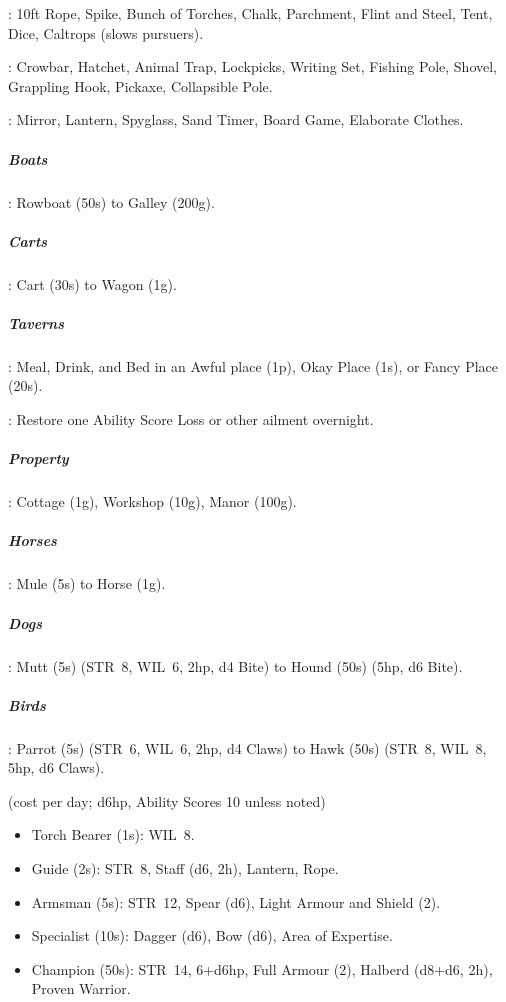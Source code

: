 \documentclass[itdr]{subfiles}
\begin{document}
: 10ft Rope, Spike, Bunch of Torches, Chalk, Parchment, Flint and Steel, Tent, Dice, Caltrops (slows pursuers).

: Crowbar, Hatchet, Animal Trap, Lockpicks, Writing Set, Fishing Pole, Shovel, Grappling Hook, Pickaxe, Collapsible Pole.

: Mirror, Lantern, Spyglass, Sand Timer, Board Game, Elaborate Clothes.


\subparagraph{Boats}: Rowboat (50s) to Galley (200g).
	
\subparagraph{Carts}: Cart (30s) to Wagon (1g).

\subparagraph{Taverns}: Meal, Drink, and Bed in an Awful place (1p), Okay Place (1s), or Fancy Place (20s).

: Restore one Ability Score Loss or other ailment overnight.

\subparagraph{Property}: Cottage (1g), Workshop (10g), Manor (100g).

\subparagraph{Horses}: Mule (5s) to Horse (1g).

\subparagraph{Dogs}: Mutt (5s) (STR~8, WIL~6, 2hp, d4 Bite) to Hound (50s) (5hp, d6 Bite).

\subparagraph{Birds}: Parrot (5s) (STR~6, WIL~6, 2hp, d4 Claws) to Hawk (50s) (STR~8, WIL~8, 5hp, d6 Claws).

 (cost per day; d6hp, Ability Scores 10
unless noted)
\begin{itemize}
	\item Torch Bearer (1s): WIL~8.
	\item Guide (2s): STR~8, Staff (d6, 2h), Lantern, Rope.
	\item Armsman (5s): STR~12, Spear (d6), Light Armour and Shield (2).
	\item Specialist (10s): Dagger (d6), Bow (d6), Area of Expertise.
	\item Champion (50s): STR~14, 6+d6hp, Full Armour (2), Halberd (d8+d6, 2h), Proven Warrior.
\end{itemize}

\break

\end{document}

